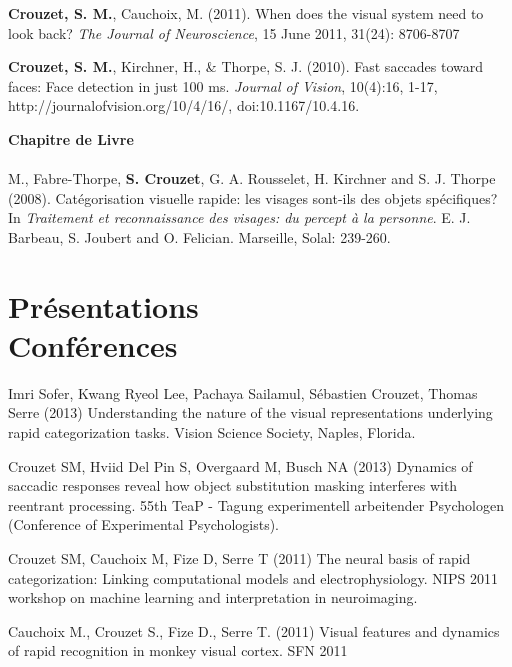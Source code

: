 \documentclass[margin,line]{resume}
\begin{document}
\begin{resume}
	\vspace{-2mm} \textbf{Crouzet, S. M.}, Cauchoix, M. (2011). When does the visual system need to look back?  \textit{The Journal of Neuroscience}, 15 June 2011, 31(24): 8706-8707

	\vspace{-2mm} \textbf{Crouzet, S. M.}, Kirchner, H., \& Thorpe, S. J.  (2010). Fast saccades toward faces: Face detection in just 100 ms. \textit{Journal of Vision}, 10(4):16, 1-17, http://journalofvision.org/10/4/16/, doi:10.1167/10.4.16.
	

\newpage
	
	\vspace{3mm}	
	\textbf{Chapitre de Livre}\\\\
	M., Fabre-Thorpe, \textbf{S. Crouzet}, G. A. Rousselet, H. Kirchner and S. J. Thorpe (2008). Catégorisation visuelle rapide: les visages sont-ils des 	objets spécifiques? In \textsl{Traitement et reconnaissance des visages: du percept à la personne}. E. J. Barbeau, S. Joubert and O. Felician. Marseille, Solal: 239-260.


\vspace{3mm}	
    \section{\mysidestyle Présentations\\Conférences}

	\footnotesize %

	Imri Sofer, Kwang Ryeol Lee, Pachaya Sailamul, Sébastien Crouzet, Thomas Serre (2013) Understanding the nature of the visual representations underlying rapid categorization tasks. Vision Science Society, Naples, Florida.

	\vspace{-2mm} Crouzet SM, Hviid Del Pin S, Overgaard M, Busch NA (2013) Dynamics of saccadic responses reveal how object substitution masking interferes with reentrant processing. 55th TeaP - Tagung experimentell arbeitender Psychologen (Conference of Experimental Psychologists).

	\vspace{-2mm} Crouzet SM, Cauchoix M, Fize D, Serre T (2011) The neural basis of rapid categorization: Linking computational models and electrophysiology. NIPS 2011 workshop on machine learning and interpretation in neuroimaging.

	\vspace{-2mm} Cauchoix M., Crouzet S., Fize D., Serre T. (2011) Visual features and dynamics of rapid recognition in monkey visual cortex. SFN 2011


\end{resume}
\end{document}
